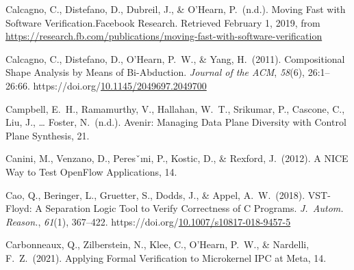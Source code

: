 \documentclass[12pt,twoside]{article}
\begin{document}
{\begin{thebibliography}{1079}
\mdbibitemlabel{}Calcagno, C., Distefano, D., Dubreil, J., \& O’Hearn, P.~(n.d.). Moving Fast with Software Verification.Facebook Research. Retrieved February 1, 2019, from \href{https://research.fb.com/publications/moving-fast-with-software-verification}{{\ttfamily https://\hspace{0pt}research.\hspace{0pt}fb.\hspace{0pt}com/\hspace{0pt}publications/\hspace{0pt}moving-\hspace{0pt}fast-\hspace{0pt}with-\hspace{0pt}software-\hspace{0pt}verification}}%

\mdbibitemlabel{}Calcagno, C., Distefano, D., O’Hearn, P.~W., \& Yang, H.~(2011). Compositional Shape Analysis by Means of Bi-Abduction. \emph{Journal of the ACM}, \emph{58}(6), 26:1–26:66. https://doi.org/\href{https://dx.doi.org/10.1145/2049697.2049700}{10.1145/2049697.2049700}%

\mdbibitemlabel{}Campbell, E.~H., Ramamurthy, V., Hallahan, W.~T., Srikumar, P., Cascone, C., Liu, J., … Foster, N.~(n.d.). Avenir: Managing Data Plane Diversity with Control Plane Synthesis, 21.%

\mdbibitemlabel{}Canini, M., Venzano, D., Peresˇıni, P., Kostic, D., \& Rexford, J.~(2012). A NICE Way to Test OpenFlow Applications, 14.%

\mdbibitemlabel{}Cao, Q., Beringer, L., Gruetter, S., Dodds, J., \& Appel, A.~W.~(2018). VST-Floyd: A Separation Logic Tool to Verify Correctness of C Programs. \emph{J.~Autom. Reason.}, \emph{61}(1), 367–422. https://doi.org/\href{https://dx.doi.org/10.1007/s10817-018-9457-5}{10.1007/s10817-018-9457-5}%

\mdbibitemlabel{}Carbonneaux, Q., Zilberstein, N., Klee, C., O’Hearn, P.~W., \& Nardelli, F.~Z.~(2021). Applying Formal Verification to Microkernel IPC at Meta, 14.%


\end{thebibliography}}
\end{document}
